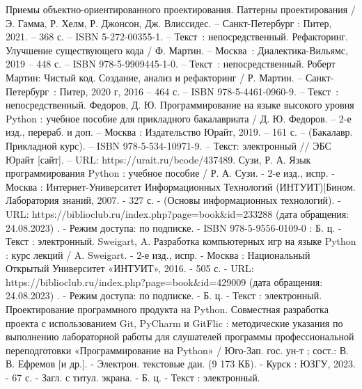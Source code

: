\begin{thebibliography}{9}
	Приемы объектно-ориентированного проектирования. Паттерны проектирования / Э. Гамма, Р. Хелм, Р. Джонсон, Дж. Влиссидес. – Санкт-Петербург : Питер, 2021. – 368 с. – ISBN 5-272-00355-1. – Текст~: непосредственный.
	Рефакторинг. Улучшение существующего кода / Ф. Мартин. – Москва~: Диалектика-Вильямс, 2019 – 448 с. – ISBN 978-5-9909445-1-0. – Текст~: непосредственный.
	Роберт Мартин: Чистый код. Создание, анализ и рефакторинг / Р. Мартин. – Санкт-Петербург~: Питер, 2020 г, 2016 – 464 с. – ISBN 978-5-4461-0960-9. – Текст~: непосредственный.
	Федоров, Д. Ю.  Программирование на языке высокого уровня Python : учебное пособие для прикладного бакалавриата / Д. Ю. Федоров. – 2-е изд., перераб. и доп. – Москва : Издательство Юрайт, 2019. – 161 с. – (Бакалавр. Прикладной курс). – ISBN 978-5-534-10971-9. – Текст: электронный // ЭБС Юрайт [сайт]. – URL: https://urait.ru/bcode/437489.
	\bibitem{}Сузи, Р. А. Язык программирования Python : учебное пособие / Р. А. Сузи. - 2-е изд., испр. - Москва : Интернет-Университет Информационных Технологий (ИНТУИТ)|Бином. Лаборатория знаний, 2007. - 327 с. - (Основы информационных технологий). - URL: https://biblioclub.ru/index.php?page=book\&id=233288 (дата обращения: 24.08.2023) . - Режим доступа: по подписке. - ISBN 978-5-9556-0109-0 : Б. ц. - Текст : электронный.
	\bibitem{}Sweigart, A. Разработка компьютерных игр на языке Python : курс лекций / A. Sweigart. - 2-е изд., испр. - Москва : Национальный Открытый Университет «ИНТУИТ», 2016. - 505 с. - URL: https://biblioclub.ru/index.php?page=book\&id=429009 (дата обращения: 24.08.2023) . - Режим доступа: по подписке. - Б. ц. - Текст : электронный.
	\bibitem{}Проектирование программного продукта на Python. Совместная разработка проекта с использованием Git, PyCharm и GitFlic : методические указания по выполнению лабораторной работы для слушателей программы профессиональной переподготовки «Программирование на Python» / Юго-Зап. гос. ун-т ; сост.: В. В. Ефремов [и др.]. - Электрон. текстовые дан. (9 173 КБ). - Курск : ЮЗГУ, 2023. - 67 с. - Загл. с титул. экрана. - Б. ц. - Текст : электронный.
\end{thebibliography}
